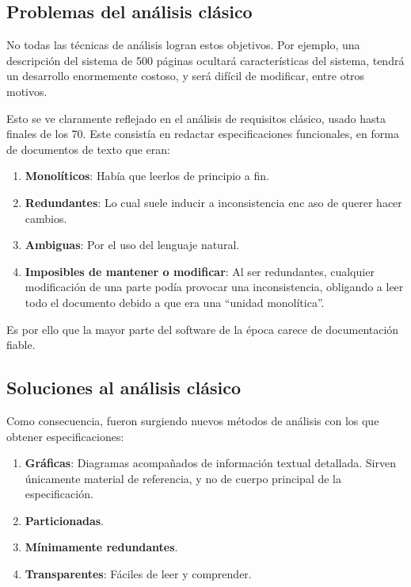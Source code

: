 \subsection{Problemas del análisis clásico}

No todas las técnicas de análisis logran estos objetivos. Por ejemplo, una descripción del sistema de 500 páginas ocultará características del sistema, tendrá un desarrollo enormemente costoso, y será difícil de modificar, entre otros motivos.

Esto se ve claramente reflejado en el análisis de requisitos clásico, usado hasta finales de los 70. Este consistía en redactar especificaciones funcionales, en forma de documentos de texto que eran:

\begin{enumerate}
    \item \textbf{Monolíticos}: Había que leerlos de principio a fin.
    \item \textbf{Redundantes}: Lo cual suele inducir a inconsistencia enc aso de querer hacer cambios.
    \item \textbf{Ambiguas}: Por el uso del lenguaje natural.
    \item \textbf{Imposibles de mantener o modificar}: Al ser redundantes, cualquier modificación de una parte podía provocar una inconsistencia, obligando a leer todo el documento debido a que era una ``unidad monolítica''.
\end{enumerate}

Es por ello que la mayor parte del software de la época carece de documentación fiable.

\subsection{Soluciones al análisis clásico}

Como consecuencia, fueron surgiendo nuevos métodos de análisis con los que obtener especificaciones:

\begin{enumerate}
    \item \textbf{Gráficas}: Diagramas acompañados de información textual detallada. Sirven únicamente material de referencia, y no de cuerpo principal de la especificación.
    \item \textbf{Particionadas}.
    \item \textbf{Mínimamente redundantes}.
    \item \textbf{Transparentes}: Fáciles de leer y comprender.
\end{enumerate}

